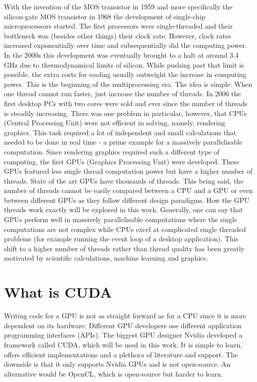 With the invention of the MOS transistor in 1959 and more specifically the silicon-gate MOS transistor in 1968 the development of single-chip microprocessors started.
The first processors were single-threaded and their bottleneck was (besides other things) their clock rate.
However, clock rates increased exponentially over time and subsequentially did the computing power.
In the 2000s this development was eventually brought to a halt at around 3.4 GHz due to thermodynamical limits of silicon. 
While pushing past that limit is possible, the extra costs for cooling usually outweight the increase in computing power.
This is the beginning of the multiprocessing era. 
The idea is simple: When one thread cannot run faster, just increase the number of threads.
In 2006 the first desktop PCs with two cores were sold and ever since the number of threads is steadily increasing.
There was one problem in particular, however, that CPUs (Central Processing Unit) were not efficient in solving, namely, rendering graphics.
This task required a lot of independent and small calculations that needed to be done in real time - a prime example for a massively parallelisable computation.
Since rendering graphics required such a different type of computing, the first GPUs (Graphics Processing Unit) were developed.
These GPUs featured less single thread computation power but have a higher number of threads.
State of the art GPUs have thousands of threads.
This being said, the number of threads cannot be easily compared between a CPU and a GPU or even between different GPUs as they follow different design paradigms.
How the GPU threads work exactly will be explored in this work.
Generally, one can say that GPUs perform well in massively parallelisable computations where the single computations are not complex while CPUs excel at complicated single threaded problems (for example running the event loop of a desktop application).
This shift to a higher number of threads rather than thread quality has been greatly motivated by scientific calculations, machine learning and graphics.

\section{What is CUDA}
Writing code for a GPU is not as straight forward as for a CPU since it is more dependent on its hardware.
Different GPU developers use different application programming interfaces (APIs).
The biggest GPU designer Nvidia developed a framework called CUDA, which will be used in this work.
It is simple to learn, offers efficient implementations and a plethora of literature and support.
The downside is that it only supports Nvidia GPUs and is not open-source.
An alternative would be OpenCL, which is open-source but harder to learn.

